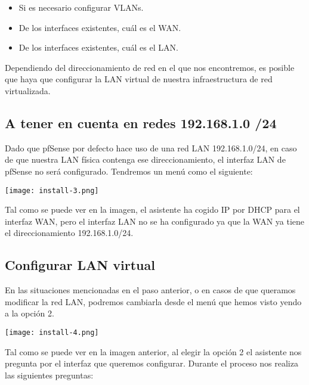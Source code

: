 \begin{itemize}
    \item Si es necesario configurar VLANs.
    \item De los interfaces existentes, cuál es el WAN.
    \item De los interfaces existentes, cuál es el LAN.
\end{itemize}

Dependiendo del direccionamiento de red en el que nos encontremos, es posible que haya que configurar la LAN virtual de nuestra infraestructura de red virtualizada.

\subsection{A tener en cuenta en redes 192.168.1.0 /24}
Dado que pfSense por defecto hace uso de una red LAN 192.168.1.0/24, en caso de que nuestra LAN física contenga ese direccionamiento, el interfaz LAN de pfSense no será configurado. Tendremos un menú como el siguiente:

\begin{center}
    \vspace{-10pt}
    \texttt{[image: install-3.png]}
    \vspace{-10pt}
\end{center}

Tal como se puede ver en la imagen, el asistente ha cogido IP por DHCP para el interfaz WAN, pero el interfaz LAN no se ha configurado ya que la WAN ya tiene el direccionamiento 192.168.1.0/24.


\subsection{Configurar LAN virtual}
En las situaciones mencionadas en el paso anterior, o en casos de que queramos modificar la red LAN, podremos cambiarla desde el menú que hemos visto yendo a la opción 2.

\begin{center}
    \vspace{-10pt}
    \texttt{[image: install-4.png]}
    \vspace{-10pt}
\end{center}

Tal como se puede ver en la imagen anterior, al elegir la opción 2 el asistente nos pregunta por el interfaz que queremos configurar. Durante el proceso nos realiza las siguientes preguntas:

